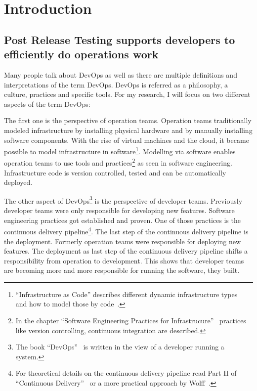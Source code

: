 \chapter{Introduction}
\section{Post Release Testing supports developers to efficiently do operations work}

Many people talk about DevOps as well as there are multiple definitions and
interpretations of the term DevOps. DevOps is referred as a philosophy, a culture,
practices and specific tools. For my research, I will focus on two different aspects of
the term DevOps:

The first one is the perspective of operation teams. Operation teams traditionally modeled
infrastructure by installing physical hardware and by manually installing software
components. With the rise of virtual machines and the cloud, it became possible to model
infrastructure in software\footnote{``Infrastructure as Code'' describes different dynamic
  infrastructure types~\cite[p. 30]{infra_as_code} and how to model those by
  code~\cite[p. 42]{infra_as_code}.}. Modelling via software enables operation teams to
use tools and practices\footnote{In the chapter ``Software Engineering Practices for
  Infrastrucure''~\cite[p. 179-194]{infra_as_code} practices like version controlling,
  continuous integration are described.} as seen in software engineering. Infrastructure
code is version controlled, tested and can be automatically deployed.

The other aspect of DevOps\footnote{The book ``DevOps''~\cite{devops} is written in the
  view of a developer running a system.} is the perspective of developer teams. Previously
developer teams were only responsible for developing new features. Software engineering
practices got established and proven. One of those practices is the continuous delivery
pipeline\footnote{For theoretical details on the continuous delivery pipeline read Part II
  of ``Continuous Delivery''~\cite[p. 103-140]{continuous_delivery} or a more practical
  approach by Wolff~\cite{continuous_delivery2}.}. The last step of the continuous
delivery pipeline is the deployment. Formerly operation teams were responsible for
deploying new features. The deployment as last step of the continuous delivery pipeline
shifts a responsibility from operation to development. This shows that developer teams are
becoming more and more responsible for running the software, they built.

